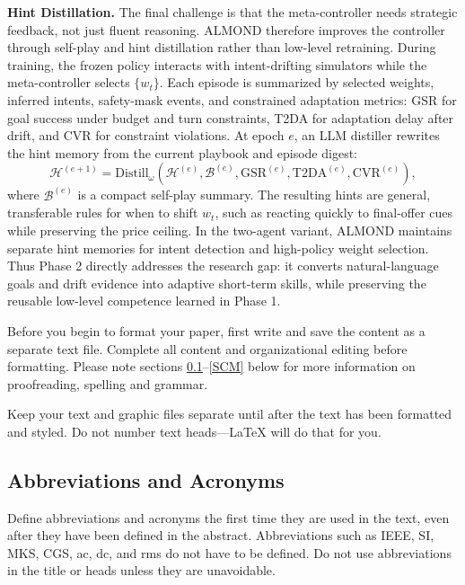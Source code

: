 \documentclass[conference]{IEEEtran}
\begin{document}
\textbf{Hint Distillation.}
The final challenge is that the meta-controller needs strategic feedback, not
just fluent reasoning. ALMOND therefore improves the controller through
self-play and hint distillation rather than low-level retraining. During
training, the frozen policy interacts with intent-drifting simulators while the
meta-controller selects $\{w_t\}$. Each episode is summarized by selected
weights, inferred intents, safety-mask events, and constrained adaptation
metrics: GSR for goal success under budget and turn constraints, T2DA for
adaptation delay after drift, and CVR for constraint violations. At epoch $e$,
an LLM distiller rewrites the hint memory from the current playbook and episode
digest:
\begin{equation}
    \mathcal{H}^{(e+1)} =
    \mathrm{Distill}_{\omega}
    (\mathcal{H}^{(e)},\mathcal{B}^{(e)},
    \mathrm{GSR}^{(e)},\mathrm{T2DA}^{(e)},\mathrm{CVR}^{(e)}),
\end{equation}
where $\mathcal{B}^{(e)}$ is a compact self-play summary. The resulting hints
are general, transferable rules for when to shift $w_t$, such as reacting
quickly to final-offer cues while preserving the price ceiling. In the
two-agent variant, ALMOND maintains separate hint memories for intent detection
and high-policy weight selection. Thus Phase 2 directly addresses the research
gap: it converts natural-language goals and drift evidence into adaptive
short-term skills, while preserving the reusable low-level competence learned
in Phase 1.


Before you begin to format your paper, first write and save the content as a 
separate text file. Complete all content and organizational editing before 
formatting. Please note sections \ref{AA}--\ref{SCM} below for more information on 
proofreading, spelling and grammar.

Keep your text and graphic files separate until after the text has been 
formatted and styled. Do not number text heads---{\LaTeX} will do that 
for you.

\subsection{Abbreviations and Acronyms}\label{AA}
Define abbreviations and acronyms the first time they are used in the text, 
even after they have been defined in the abstract. Abbreviations such as 
IEEE, SI, MKS, CGS, ac, dc, and rms do not have to be defined. Do not use 
abbreviations in the title or heads unless they are unavoidable.
\end{document}

